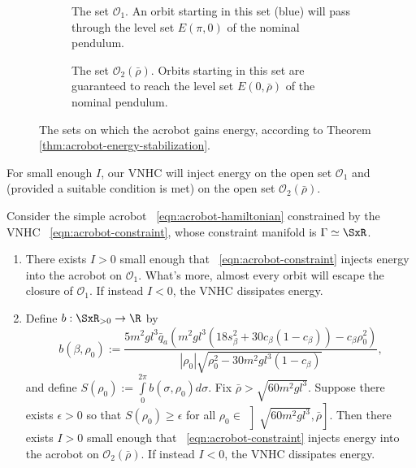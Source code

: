 \begin{figure}
    \centering
    \begin{subfigure}[t]{0.45\textwidth}
        
        \caption{The set \(\mathcal{O}_1\). An orbit starting in this set (blue)
            will pass through the level set \(E(\pi,0)\) of the nominal pendulum.}
        \label{fig:acrobot-oscillation-domain}
    \end{subfigure}
    \hfill
    \begin{subfigure}[t]{0.45\textwidth}
        
        \caption{The set \(\mathcal{O}_2(\bar{\rho})\). Orbits starting in this
            set are guaranteed to reach the level set \(E(0,\bar{\rho})\) of the
            nominal pendulum.}
            \label{fig:acrobot-o2}
    \end{subfigure}
    \caption{The sets on which the acrobot gains energy, according to Theorem
        \ref{thm:acrobot-energy-stabilization}.}
\end{figure}

For small enough \(I\), our VNHC will inject energy on the open set
\(\mathcal{O}_1\) and (provided a suitable condition is met) on the open set
\(\mathcal{O}_2(\bar{\rho})\).

\begin{thm}\label{thm:acrobot-energy-stabilization}
    Consider the simple acrobot ~\eqref{eqn:acrobot-hamiltonian} constrained by
    the VNHC ~\eqref{eqn:acrobot-constraint}, whose
    constraint manifold is \(\Gamma \simeq \SxR\).
\begin{enumerate}
    \item There exists \(I > 0\) small enough that 
    ~\eqref{eqn:acrobot-constraint} injects energy into the acrobot on
    \(\mathcal{O}_1\).
    What's more, almost every orbit will escape the closure of 
    \(\mathcal{O}_1\).
    If instead \(I < 0\), the VNHC dissipates energy.
\item Define \(b : \SxR_{> 0} \rightarrow \R\) by
    \[
        b(\beta,\rho_0) := 
        \frac{5m^2 g l^3 \bar{q}_a \left(
            m^2gl^3\left(18s_\beta^2 + 30c_\beta(1 - c_\beta)\right)
            - c_\beta\rho_0^2
        \right)}{
        |\rho_0|\sqrt{\rho_0^2 - 30m^2gl^3(1 - c_\beta)}
        }
        ,
    \]
    and define \(S(\rho_0) := \int \limits_{0}^{2\pi} b(\sigma,\rho_0)d\sigma\).
    Fix \(\bar{\rho} > \sqrt{60m^2gl^3}\).
    Suppose there exists \(\epsilon > 0\) so that \(S(\rho_0) \geq \epsilon\) for
    all \(\rho_0 \in \, \left]\sqrt{60m^2gl^3}, \bar{\rho}\right]\).
    Then there exists \(I > 0\) small enough that
    ~\eqref{eqn:acrobot-constraint} injects energy into the acrobot on
    \(\mathcal{O}_2(\bar{\rho})\).
    If instead \(I < 0\), the VNHC dissipates energy.
\end{enumerate}
\end{thm}

